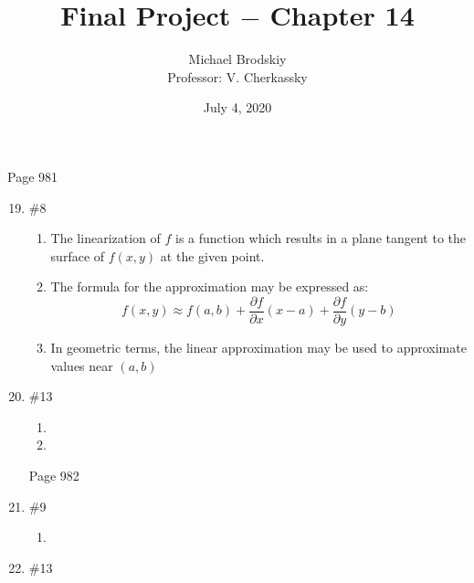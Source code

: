 \documentclass[12pt]{article}
\title{Final Project $-$ Chapter 14}
\date{July 4, 2020}
\author{Michael Brodskiy\\ \small Professor: V. Cherkassky}
\begin{document}
\maketitle

\begin{center}

Page 981

\end{center}

\begin{enumerate}

\setcounter{enumi}{18}

  \item \#8 \begin{enumerate}

      \item The linearization of $f$ is a function which results in a plane tangent to the surface of $f(x,y)$ at the given point. 

      \item The formula for the approximation may be expressed as:
        $$f(x,y)\approx f(a,b)+\frac{\partial f}{\partial x}(x-a)+\frac{\partial f}{\partial y}(y-b)$$

      \item In geometric terms, the linear approximation may be used to approximate values near $(a,b)$

    \end{enumerate}

  \item \#13 \begin{enumerate}

      \item 

      \item 

    \end{enumerate}

    \begin{center}

Page 982

    \end{center}

    \item \#9

    \begin{enumerate}

      \item 

    \end{enumerate}

    \item \#13 \begin{enumerate}


\end{enumerate}
\end{enumerate}
\end{document}
